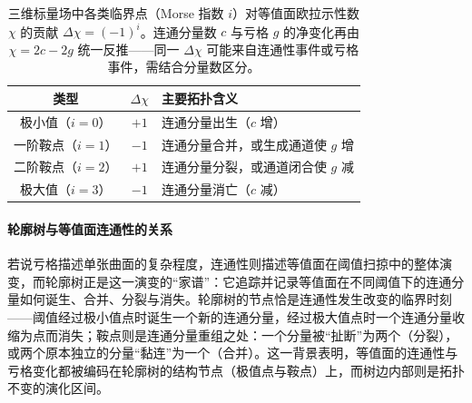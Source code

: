 \documentclass[twocolumn, a4paper, 10pt]{article}
\begin{document}
\begin{table}[h]
\centering
\small
\caption{三维标量场中各类临界点（Morse 指数 $i$）对等值面欧拉示性数 $\chi$ 的贡献 $\Delta\chi=(-1)^i$。连通分量数 $c$ 与亏格 $g$ 的净变化再由 $\chi=2c-2g$ 统一反推——同一 $\Delta\chi$ 可能来自连通性事件或亏格事件，需结合分量数区分。}
\label{tab:critical}
\begin{tabular}{ccl}
\hline
类型 & $\Delta\chi$ & 主要拓扑含义 \\
\hline
极小值（$i=0$） & $+1$ & 连通分量出生（$c$ 增） \\
一阶鞍点（$i=1$） & $-1$ & 连通分量合并，或生成通道使 $g$ 增 \\
二阶鞍点（$i=2$） & $+1$ & 连通分量分裂，或通道闭合使 $g$ 减 \\
极大值（$i=3$） & $-1$ & 连通分量消亡（$c$ 减） \\
\hline
\end{tabular}
\end{table}

\paragraph{轮廓树与等值面连通性的关系}若说亏格描述单张曲面的复杂程度，连通性则描述等值面在阈值扫掠中的整体演变，而轮廓树正是这一演变的“家谱”：它追踪并记录等值面在不同阈值下的连通分量如何诞生、合并、分裂与消失。轮廓树的节点恰是连通性发生改变的临界时刻——阈值经过极小值点时诞生一个新的连通分量，经过极大值点时一个连通分量收缩为点而消失；鞍点则是连通分量重组之处：一个分量被“扯断”为两个（分裂），或两个原本独立的分量“黏连”为一个（合并）。这一背景表明，等值面的连通性与亏格变化都被编码在轮廓树的结构节点（极值点与鞍点）上，而树边内部则是拓扑不变的演化区间。
\end{document}
